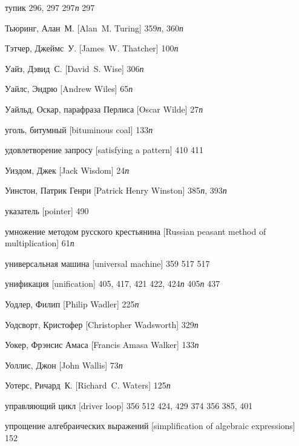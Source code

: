 \begin{theindex}
\item {тупик} 296, 297
   297{\it п}
   297
\item {Тьюринг, Алан~М. [Alan~M. Turing]} 359{\it п}, 360{\it п}
\item {Тэтчер, Джеймс~У. [James~W. Thatcher]} 100{\it п}
\bigskip
\item {Уайз, Дэвид~С. [David~S. Wise]} 306{\it п}
\item {Уайлс, Эндрю [Andrew Wiles]} 65{\it п}
\item {Уайльд, Оскар, парафраза Перлиса [Oscar Wilde]} 27{\it п}
\item {уголь, битумный [bituminous coal]} 133{\it п}
\item {удовлетворение запросу [satisfying a pattern]} 410
   411
\item {Уиздом, Джек [Jack Wisdom]} 24{\it п}
\item {Уинстон, Патрик Генри [Patrick Henry Winston]} 385{\it п}, 393{\it п}
\item {указатель [pointer]}
   490
\item {умножение методом русского крестьянина [Russian peasant method of mul\-ti\-pli\-ca\-tion]} 61{\it п}
\item {универсальная машина [universal machine]} 359
   517
   517
\item {унификация [unification]} 405, 417, 421
   422, 424{\it п}
   405{\it п}
   437
\item {Уодлер, Филип [Philip Wadler]} 225{\it п}
\item {Уодсворт, Кристофер [Christopher Wadsworth]} 329{\it п}
\item {Уокер, Фрэнсис Амаса [Francis Amasa Walker]} 133{\it п}
\item {Уоллис, Джон [John Wallis]} 73{\it п}
\item {Уотерс, Ричард~К. [Richard~C. Waters]} 125{\it п}
\item {управляющий цикл [driver loop]} 356
   512
   424, 429
   374
   356
   385, 401
\item {упрощение алгебраических выражений [simplification of algebraic expressions]} 152

\end{theindex}

